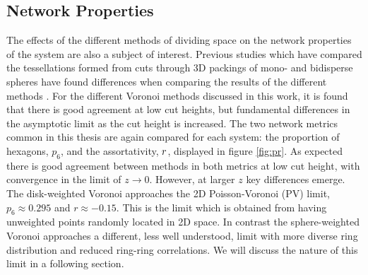 \subsection{Network Properties}

The effects of the different methods of dividing space on the network properties of the system are also a subject of interest.
Previous studies which have compared the tessellations formed from cuts through 3D packings of mono- and bidisperse spheres have found differences when comparing the results of the different methods \cite{Oger2000,Gervois2004}.
For the different Voronoi methods discussed in this work, it is found that there is good agreement at low cut heights, but fundamental differences in the asymptotic limit as the cut height is increased.
The two network metrics common in this thesis are again compared for each system: the proportion of hexagons, $p_6$, and the assortativity, $r$, displayed in figure \ref{fig:pr}.
As expected there is good agreement between methods in both metrics at low cut height, with convergence in the limit of $z\rightarrow 0$.
However, at larger $z$ key differences emerge. 
The disk\--weighted Voronoi approaches the 2D Poisson\--Voronoi (PV) limit, $p_6\approx0.295$ and $r\approx -0.15$.
This is the limit which is obtained from having unweighted points randomly located in 2D space.
In contrast the sphere\--weighted Voronoi approaches a different, less well understood, limit with more diverse ring distribution and reduced ring\--ring correlations. We
will discuss the nature of this limit in a following section.

